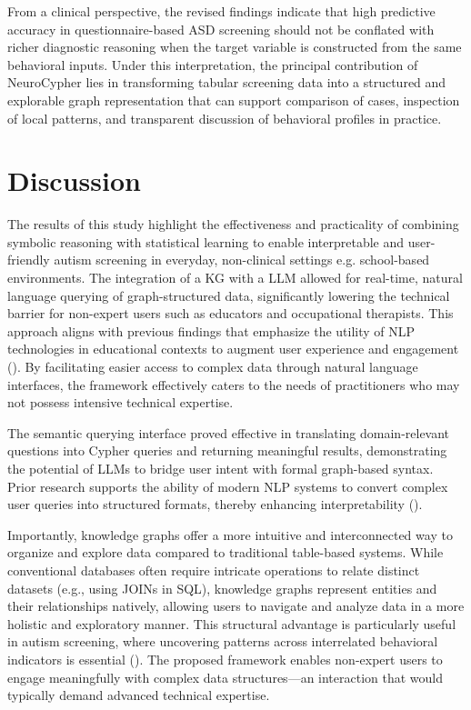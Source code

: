 \documentclass[pdflatex,sn-basic]{sn-jnl}%
\theoremstyle{thmstyleone}%
\theoremstyle{thmstyletwo}%
\theoremstyle{thmstylethree}%
\begin{document}
From a clinical perspective, the revised findings indicate that high predictive accuracy in questionnaire-based ASD screening should not be conflated with richer diagnostic reasoning when the target variable is constructed from the same behavioral inputs. Under this interpretation, the principal contribution of NeuroCypher lies in transforming tabular screening data into a structured and explorable graph representation that can support comparison of cases, inspection of local patterns, and transparent discussion of behavioral profiles in practice.




  \section{Discussion}\label{sec12}
  The results of this study highlight the effectiveness and practicality of combining symbolic reasoning with statistical
  learning to enable interpretable and user-friendly autism screening in everyday, non-clinical settings e.g. school-based
  environments. The integration of a KG with a LLM allowed for real-time, natural language querying of graph-structured data,
  significantly lowering the technical barrier for non-expert users such as educators and occupational therapists. This approach
  aligns with previous findings that emphasize the utility of NLP technologies in educational contexts to augment user experience
  and engagement (\cite{10.1109/access.2022.3177752, 10.1609/aaai.v30i1.9879}). By facilitating easier access to complex data
  through natural language interfaces, the framework effectively caters to the needs of practitioners who may not possess
  intensive technical expertise.

  The semantic querying interface proved effective in translating domain-relevant questions into Cypher queries and returning
  meaningful results, demonstrating the potential of LLMs to bridge user intent with formal graph-based syntax. Prior research
  supports the ability of modern NLP systems to convert complex user queries into structured formats, thereby enhancing
  interpretability (\cite{10.20944/preprints202410.1324.v1}).

  Importantly, knowledge graphs offer a more intuitive and interconnected way to organize and explore data compared to
  traditional table-based systems. While conventional databases often require intricate operations to relate distinct datasets
  (e.g., using JOINs in SQL), knowledge graphs represent entities and their relationships natively, allowing users to navigate
  and analyze data in a more holistic and exploratory manner. This structural advantage is particularly useful in autism
  screening, where uncovering patterns across interrelated behavioral indicators is essential (\cite{10.1145/3447772, 10.1109/
  access.2020.3012670}). The proposed framework enables non-expert users to engage meaningfully with complex data structures—an
  interaction that would typically demand advanced technical expertise.
\end{document}
